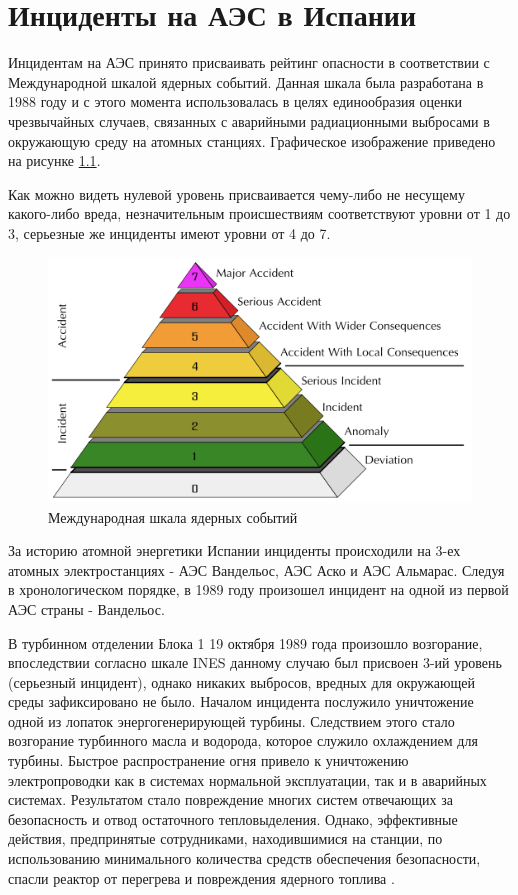 \chapter{Инциденты на АЭС в Испании}

Инцидентам на АЭС принято присваивать рейтинг опасности в соответствии с Международной шкалой ядерных событий. Данная шкала была разработана в 1988 году и с этого момента использовалась в целях единообразия оценки чрезвычайных случаев, связанных с аварийными радиационными выбросами в окружающую среду на атомных станциях. Графическое изображение приведено на рисунке \ref{pic:INESscale}.

Как можно видеть нулевой уровень присваивается чему-либо не несущему какого-либо вреда, незначительным происшествиям соответствуют уровни от 1 до 3, серьезные же инциденты имеют уровни от 4 до 7.

\begin{figure}[h]
	\begin{center}
		\includegraphics[width=.5\columnwidth]{./img/INESscale.png}
	\end{center}
	\caption{Международная шкала ядерных событий}
	\label{pic:INESscale}
\end{figure}

За историю атомной энергетики Испании инциденты происходили на 3-ех атомных электростанциях - АЭС Вандельос, АЭС Аско и АЭС Альмарас.
Следуя в хронологическом порядке, в 1989 году произошел инцидент на одной из первой АЭС страны - Вандельос.

В турбинном отделении Блока 1 19 октября 1989 года произошло возгорание, впоследствии согласно шкале INES данному случаю был присвоен 3-ий уровень (серьезный инцидент), однако никаких выбросов, вредных для окружающей среды зафиксировано не было.
Началом инцидента послужило уничтожение одной из лопаток энергогенерирующей турбины. Следствием этого стало возгорание турбинного масла и водорода, которое служило охлаждением для турбины. Быстрое распространение огня привело к уничтожению электропроводки как в системах нормальной эксплуатации, так и в аварийных системах. Результатом стало повреждение многих систем отвечающих за безопасность и отвод остаточного тепловыделения. Однако, эффективные действия, предпринятые сотрудниками, находившимися на станции, по использованию минимального количества средств обеспечения безопасности, спасли реактор от перегрева и повреждения ядерного топлива \cite{nuclearSafety}.

